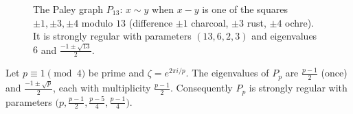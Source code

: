 \begin{figure}[ht]
\centering
{}
\caption{The Paley graph $P_{13}$: $x\sim y$ when $x-y$ is one of the squares $\pm1,\pm3,\pm4$ modulo $13$ (difference $\pm1$ charcoal,
$\pm3$ rust, $\pm4$ ochre). It is strongly regular with parameters $(13,6,2,3)$ and eigenvalues $6$ and $\frac{-1\pm\sqrt{13}}2$.}
\label{linear:fig:paley}
\end{figure}

\begin{theorem}\label{linear:thm:paley}
Let $p\equiv1\pmod4$ be prime and $\zeta=e^{2\pi i/p}$. The eigenvalues of $P_p$ are $\frac{p-1}2$ (once) and $\frac{-1\pm\sqrt p}2$,
each with multiplicity $\frac{p-1}2$. Consequently $P_p$ is strongly regular with parameters $\bigl(p,\frac{p-1}2,\frac{p-5}4,
\frac{p-1}4\bigr)$.
\end{theorem}
